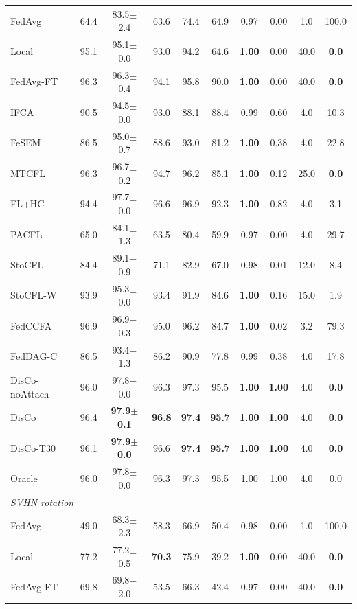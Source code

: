 {\begin{tabular}{lccccccccc}
FedAvg & 64.4 & 83.5$\pm$2.4 & 63.6 & 74.4 & 64.9 & 0.97 & 0.00 & 1.0 & 100.0 \\
Local & 95.1 & 95.1$\pm$0.0 & 93.0 & 94.2 & 64.6 & \textbf{1.00} & 0.00 & 40.0 & \textbf{0.0} \\
FedAvg-FT & 96.3 & 96.3$\pm$0.4 & 94.1 & 95.8 & 90.0 & \textbf{1.00} & 0.00 & 40.0 & \textbf{0.0} \\
IFCA & 90.5 & 94.5$\pm$0.0 & 93.0 & 88.1 & 88.4 & 0.99 & 0.60 & 4.0 & 10.3 \\
FeSEM & 86.5 & 95.0$\pm$0.7 & 88.6 & 93.0 & 81.2 & \textbf{1.00} & 0.38 & 4.0 & 22.8 \\
MTCFL & 96.3 & 96.7$\pm$0.2 & 94.7 & 96.2 & 85.1 & \textbf{1.00} & 0.12 & 25.0 & \textbf{0.0} \\
FL+HC & 94.4 & 97.7$\pm$0.0 & 96.6 & 96.9 & 92.3 & \textbf{1.00} & 0.82 & 4.0 & 3.1 \\
PACFL & 65.0 & 84.1$\pm$1.3 & 63.5 & 80.4 & 59.9 & 0.97 & 0.00 & 4.0 & 29.7 \\
StoCFL & 84.4 & 89.1$\pm$0.9 & 71.1 & 82.9 & 67.0 & 0.98 & 0.01 & 12.0 & 8.4 \\
StoCFL-W & 93.9 & 95.3$\pm$0.0 & 93.4 & 91.9 & 84.6 & \textbf{1.00} & 0.16 & 15.0 & 1.9 \\
FedCCFA & 96.9 & 96.9$\pm$0.3 & 95.0 & 96.2 & 84.7 & \textbf{1.00} & 0.02 & 3.2 & 79.3 \\
FedDAG-C & 86.5 & 93.4$\pm$1.3 & 86.2 & 90.9 & 77.8 & 0.99 & 0.38 & 4.0 & 17.8 \\
DisCo-noAttach & 96.0 & 97.8$\pm$0.0 & 96.3 & 97.3 & 95.5 & \textbf{1.00} & \textbf{1.00} & 4.0 & \textbf{0.0} \\
DisCo & 96.4 & \textbf{97.9$\pm$0.1} & \textbf{96.8} & \textbf{97.4} & \textbf{95.7} & \textbf{1.00} & \textbf{1.00} & 4.0 & \textbf{0.0} \\
DisCo-T30 & 96.1 & \textbf{97.9$\pm$0.0} & 96.6 & \textbf{97.4} & \textbf{95.7} & \textbf{1.00} & \textbf{1.00} & 4.0 & \textbf{0.0} \\
Oracle & 96.0 & 97.8$\pm$0.0 & 96.3 & 97.3 & 95.5 & 1.00 & 1.00 & 4.0 & 0.0 \\
\midrule
\multicolumn{10}{l}{\textit{SVHN rotation}}\\
FedAvg & 49.0 & 68.3$\pm$2.3 & 58.3 & 66.9 & 50.4 & 0.98 & 0.00 & 1.0 & 100.0 \\
Local & 77.2 & 77.2$\pm$0.5 & \textbf{70.3} & 75.9 & 39.2 & \textbf{1.00} & 0.00 & 40.0 & \textbf{0.0} \\
FedAvg-FT & 69.8 & 69.8$\pm$2.0 & 53.5 & 66.3 & 42.4 & 0.97 & 0.00 & 40.0 & \textbf{0.0} \\

\end{tabular}}
